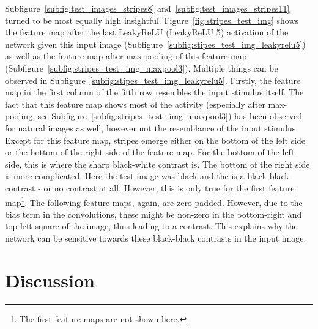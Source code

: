 \documentclass[11pt]{article}
\begin{document}
    Subfigure~\ref{subfig:test_images_stripes8} and~\ref{subfig:test_images_stripes11} turned to be most equally high insightful.
    Figure~\ref{fig:stripes_test_img} shows the feature map after the last LeakyReLU (LeakyReLU 5) activation of the network given this input image (Subfigure~\ref{subfig:stipes_test_img_leakyrelu5}) as well as the feature map after max-pooling of this feature map (Subfigure~\ref{subfig:stripes_test_img_maxpool3}).
    Multiple things can be observed in Subfigure~\ref{subfig:stipes_test_img_leakyrelu5}.
    Firstly, the feature map in the first column of the fifth row resembles the input stimulus itself.
    The fact that this feature map shows most of the activity (especially after max-pooling, see Subfigure~\ref{subfig:stripes_test_img_maxpool3}) has been observed for natural images as well, however not the resemblance of the input stimulus.
    Except for this feature map, stripes emerge either on the bottom of the left side or the bottom of the right side of the feature map.
    For the bottom of the left side, this is where the sharp black-white contrast is.
    The bottom of the right side is more complicated.
    Here the test image was black and the  is a black-black contrast - or no contrast at all.
    However, this is only true for the first feature map\footnote{The first feature maps are not shown here.}.
    The following feature maps, again, are zero-padded.
    However, due to the bias term in the convolutions, these might be non-zero in the bottom-right and top-left square of the image, thus leading to a contrast.
    This explains why the network can be sensitive towards these black-black contrasts in the input image.


    \section{Discussion}\label{sec:discussion}
\end{document}
